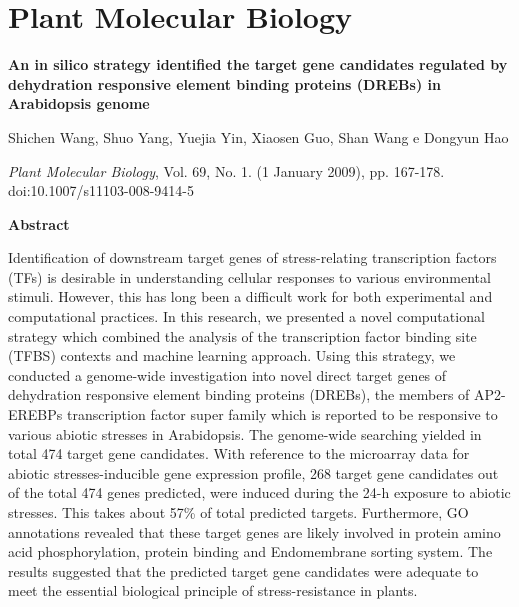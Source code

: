\chapter{Plant Molecular Biology}


{\Large \bf An in silico strategy identified the target gene candidates regulated by dehydration responsive element binding proteins (DREBs) in Arabidopsis genome}

Shichen Wang, Shuo Yang, Yuejia Yin, Xiaosen Guo, Shan Wang e Dongyun Hao

{\it Plant Molecular Biology}, Vol. 69, No. 1. (1 January 2009), pp. 167-178. doi:10.1007/s11103-008-9414-5

{\large \bf Abstract}

Identification of downstream target genes of stress-relating transcription factors (TFs) is desirable in understanding cellular responses to various environmental stimuli. However, this has long been a difficult work for both experimental and computational practices. In this research, we presented a novel computational strategy which combined the analysis of the transcription factor binding site (TFBS) contexts and machine learning approach. Using this strategy, we conducted a genome-wide investigation into novel direct target genes of dehydration responsive element binding proteins (DREBs), the members of AP2-EREBPs transcription factor super family which is reported to be responsive to various abiotic stresses in Arabidopsis. The genome-wide searching yielded in total 474 target gene candidates. With reference to the microarray data for abiotic stresses-inducible gene expression profile, 268 target gene candidates out of the total 474 genes predicted, were induced during the 24-h exposure to abiotic stresses. This takes about 57\% of total predicted targets. Furthermore, GO annotations revealed that these target genes are likely involved in protein amino acid phosphorylation, protein binding and Endomembrane sorting system. The results suggested that the predicted target gene candidates were adequate to meet the essential biological principle of stress-resistance in plants. 